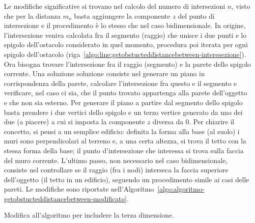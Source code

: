 Le modifiche significative si trovano nel calcolo del numero di intersezioni $n$,
visto che per la distanza $m_o$ basta aggiungere la componente $z$ del punto di intersezione
e il procedimento è lo stesso che nel caso bidimensionale.
In origine, l'intersezione veniva calcolata fra il segmento (raggio) che unisce i due punti e lo spigolo dell'ostacolo considerato in quel
momento, procedura poi iterata per ogni spigolo dell'ostacolo (riga~\ref{algo:line:getobstucteddistancebetween-interesezione}).
Ora bisogna trovare l'intersezione fra il raggio (segmento) e la parete dello spigolo corrente.
Una soluzione soluzione consiste nel generare un piano in corrispondenza della parete,
calcolare l'intersezione fra questo e il segmento e verificare, nel caso ci sia,
che il punto trovato appartenga alla parete dell'oggetto e che non sia esterno.
Per generare il piano a partire dal segmento dello spigolo basta prendere i due vertici dello spigolo
e un terzo vertice generato da uno dei due (a piacere) a cui si imposta la componente $z$ diversa da $0$.
Per chiarire il concetto, si pensi a un semplice edificio: definita la forma alla base (al suolo) i muri sono perpendicolari
al terreno e, a una certa altezza, si trova il tetto con la stessa forma della base;
il punto d'intersezione che interessa si trova sulla faccia del muro corrente.
L'ultimo passo, non necessario nel caso bidimensionale, consiste nel controllare se il raggio (fra i nodi)
interseca la faccia superiore dell'oggetto (il tetto in un edificio), seguendo un procedimento simile
ai casi delle pareti.
Le modifiche sono riportate nell'Algoritmo~\ref{algo:algoritmo-getobstucteddistancebetween-modificato}.
%
\begin{italianalgorithm}[!h]
\caption{Modifica all'algoritmo per includere la terza dimensione.}\label{algo:algoritmo-getobstucteddistancebetween-modificato}
\begin{algorithmic}[1]
	\State{\ldots}
	\setcounter{ALG@line}{7}
				\EndIf{}
			\EndFor{}
			\EndIf{}
		\EndIf{}
	\EndFor{}
	\EndProcedure{}
\end{algorithmic}
\end{italianalgorithm}
%
